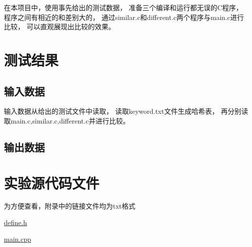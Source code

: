 \documentclass[a4paper]{article}
\begin{document}
    {{在本项目中，使用事先给出的测试数据，
    准备三个编译和运行都无误的C程序，程序之间有相近的和差别大的，
    通过similar.c和different.c两个程序与main.c进行比较，
    可以直观展现出比较的效果。}}


    \section{测试结果}\label{sec:result}

    \subsection{输入数据}\label{subsec:in}
    {{输入数据从给出的测试文件中读取，
    读取keyword.txt文件生成哈希表，
    再分别读取main.c,similar.c,different.c并进行比较。}}

    \subsection{输出数据}\label{subsec:out}







    \noindent{ }



    \noindent{ }




    \appendix


    \section{实验源代码文件}\label{sec:appendix1}
    {{为方便查看，附录中的链接文件均为txt格式}}

    \href{../exp6/define.h.txt}{\underline{define.h}}

    \href{../exp6/main.cpp.txt}{\underline{main.cpp}}
\end{document}
